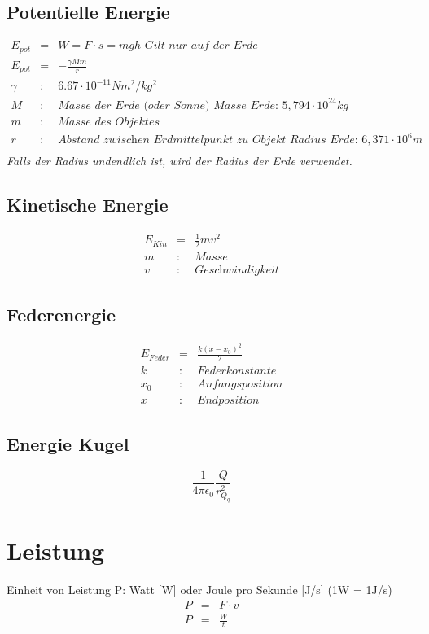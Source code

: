 \documentclass[11pt]{article}
\begin{document}
\subsection{Potentielle Energie}
\begin{eqnarray*}
E_{pot} &=& W = F\cdot s = mgh \textit{  Gilt nur auf der Erde}\\
E_{pot} &=& -\frac{\gamma Mm}{r}\\
\gamma &:& 6.67 \cdot 10^{-11} Nm^2/kg^2\\
M &:& \textit{Masse der Erde (oder Sonne) }\textit{Masse Erde: }5,794\cdot 10^{24} kg\\
m &:& \textit{Masse des Objektes}\\
r &:& \textit{Abstand zwischen Erdmittelpunkt zu Objekt  Radius Erde: } 6,371\cdot 10^6 m\\
\end{eqnarray*}
\textit{Falls der Radius undendlich ist, wird der Radius der Erde verwendet.}
\subsection{Kinetische Energie}
\begin{eqnarray*}
E_{Kin} &=& \frac{1}{2}mv^2\\
m &:& \textit{Masse}\\
v &:& \textit{Geschwindigkeit}
\end{eqnarray*}

\subsection{Federenergie}
\begin{eqnarray*}
E_{Feder} &=& \frac{k(x-x_0)^2}{2}\\
k &:& \textit{Federkonstante}\\
x_0 &:& \textit{Anfangsposition}\\
x &:& \textit{Endposition}
\end{eqnarray*}

\subsection{Energie Kugel}
$$\frac{1}{4\pi \epsilon_0}\frac{Q}{r_{Q_q}^2}$$
\section{Leistung}
Einheit von Leistung P: Watt [W] oder Joule pro Sekunde [J/s] (1W = 1J/s)
\begin{eqnarray*}
P &=& F \cdot v\\
P &=& \frac{W}{t}
\end{eqnarray*}
\end{document}
